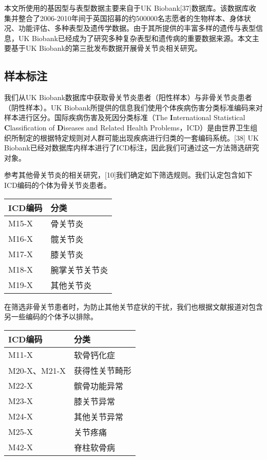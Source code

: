 \documentclass[
]{article}
\begin{document}
本文所使用的基因型与表型数据主要来自于UK
Biobank{[}37{]}数据库。该数据库收集并整合了2006-2010年间于英国招募的约500000名志愿者的生物样本、身体状况、功能评估、多种表型及遗传学数据。由于其所提供的丰富多样的遗传与表型信息，UK
Biobank已经成为了研究多种复杂表型和遗传病的重要数据来源。本文主要基于UK
Biobank的第三批发布数据开展骨关节炎相关研究。

\hypertarget{ux6837ux672cux6807ux6ce8}{%
\subsection{样本标注}\label{ux6837ux672cux6807ux6ce8}}

我们从UK
Biobank数据库中获取骨关节炎患者（阳性样本）与非骨关节炎患者（阴性样本）。UK
Biobank所提供的信息我们使用个体疾病伤害分类标准编码来对样本进行区分。国际疾病伤害及死因分类标准（The
\textbf{I}nternational Statistical \textbf{C}lassification of
\textbf{D}iseases and Related Health
Problems，ICD）是由世界卫生组织所制定的根据特定规则对人群可能出现疾病进行归类的一套编码系统。{[}38{]}
UK
Biobank已经对数据库内样本进行了ICD标注，因此我们可通过这一方法筛选研究对象。

参考其他骨关节炎的相关研究，{[}10{]}我们确定如下筛选规则。我们认定包含如下ICD编码的个体为骨关节炎患者。

\begin{longtable}[]{@{}ll@{}}
\toprule()
ICD编码 & 分类 \\
\midrule()
\endhead
M15-X & 骨关节炎 \\
M16-X & 髋关节炎 \\
M17-X & 膝关节炎 \\
M18-X & 腕掌关节关节炎 \\
M19-X & 其他关节炎 \\
\bottomrule()
\end{longtable}

在筛选非骨关节患者时，为防止其他关节症状的干扰，我们也根据文献报道对包含另一些编码的个体予以排除。

\begin{longtable}[]{@{}ll@{}}
\toprule()
ICD编码 & 分类 \\
\midrule()
\endhead
M11-X & 软骨钙化症 \\
M20-X、M21-X & 获得性关节畸形 \\
M22-X & 髌骨功能异常 \\
M23-X & 膝关节异常 \\
M24-X & 其他关节异常 \\
M25-X & 关节疼痛 \\
M42-X & 脊柱软骨病 \\
\bottomrule()
\end{longtable}
\end{document}
